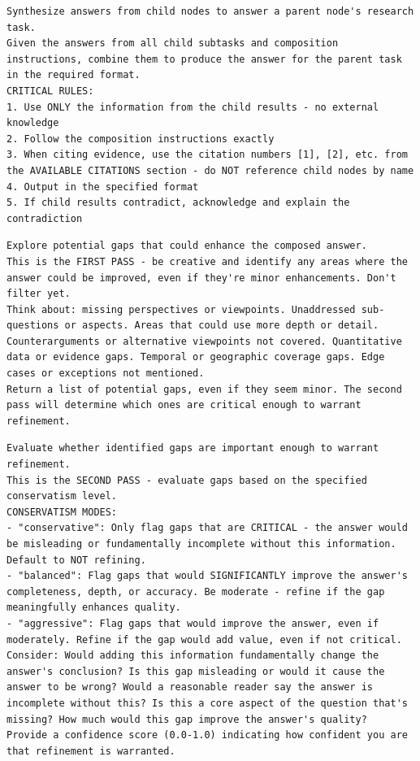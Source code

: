 \begin{lstlisting}[title={ParentNodeSynthesizer (Phase 2, parents)}]
Synthesize answers from child nodes to answer a parent node's research task.
Given the answers from all child subtasks and composition instructions, combine them to produce the answer for the parent task in the required format.
CRITICAL RULES:
1. Use ONLY the information from the child results - no external knowledge
2. Follow the composition instructions exactly
3. When citing evidence, use the citation numbers [1], [2], etc. from the AVAILABLE CITATIONS section - do NOT reference child nodes by name
4. Output in the specified format
5. If child results contradict, acknowledge and explain the contradiction
\end{lstlisting}

\begin{lstlisting}[title={GapExplorer (Phase 2, refinement, first pass)}]
Explore potential gaps that could enhance the composed answer.
This is the FIRST PASS - be creative and identify any areas where the answer could be improved, even if they're minor enhancements. Don't filter yet.
Think about: missing perspectives or viewpoints. Unaddressed sub-questions or aspects. Areas that could use more depth or detail. Counterarguments or alternative viewpoints not covered. Quantitative data or evidence gaps. Temporal or geographic coverage gaps. Edge cases or exceptions not mentioned.
Return a list of potential gaps, even if they seem minor. The second pass will determine which ones are critical enough to warrant refinement.
\end{lstlisting}

\begin{lstlisting}[title={GapImportanceEvaluator (Phase 2, refinement, second pass)}]
Evaluate whether identified gaps are important enough to warrant refinement.
This is the SECOND PASS - evaluate gaps based on the specified conservatism level.
CONSERVATISM MODES:
- "conservative": Only flag gaps that are CRITICAL - the answer would be misleading or fundamentally incomplete without this information. Default to NOT refining.
- "balanced": Flag gaps that would SIGNIFICANTLY improve the answer's completeness, depth, or accuracy. Be moderate - refine if the gap meaningfully enhances quality.
- "aggressive": Flag gaps that would improve the answer, even if moderately. Refine if the gap would add value, even if not critical.
Consider: Would adding this information fundamentally change the answer's conclusion? Is this gap misleading or would it cause the answer to be wrong? Would a reasonable reader say the answer is incomplete without this? Is this a core aspect of the question that's missing? How much would this gap improve the answer's quality?
Provide a confidence score (0.0-1.0) indicating how confident you are that refinement is warranted.
\end{lstlisting}

